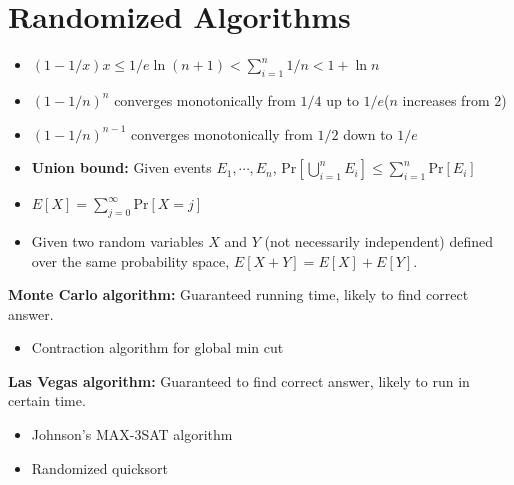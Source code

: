 \documentclass{article}
\begin{document}


\section*{Randomized Algorithms}
\begin{itemize}
    \item $(1 - 1/x) x \leq 1/e$\qquad $\ln(n+1)<\sum\limits_{i=1}^n 1/n <1+\ln n $
    \item $(1 - 1/n)^{n}$ converges monotonically from $1/4$ up to $1/e$($n$ increases from $2$)
    \item $(1 - 1/n)^{n-1}$ converges monotonically from $1/2$ down to $1/e$
    \item \textbf{Union bound: } Given events $E_1, \cdots, E_n$, 
    $\text{Pr}[\bigcup\limits_{i=1}^n E_i]\leq \sum\limits_{i=1}^n \text{Pr}[E_i]$
    \item $E[X]=\sum\limits_{j=0}^\infty \text{Pr}[X=j]$
    \item Given two random variables $X$ and $Y$ (not necessarily independent) defined over the same probability space, $E[X + Y] = E[X] + E[Y]$.
\end{itemize}

\textbf{Monte Carlo algorithm: } Guaranteed running time, likely to find correct answer.
\begin{itemize}
    \item Contraction algorithm for global min cut
\end{itemize} 
\textbf{Las Vegas algorithm: } Guaranteed to find correct answer, likely to run in certain time.
\begin{itemize}
    \item Johnson's MAX-3SAT algorithm
    \item Randomized quicksort
\end{itemize}
\end{document}

